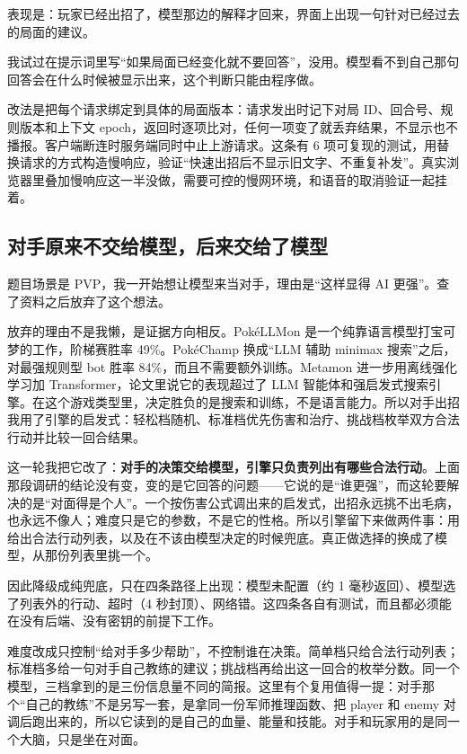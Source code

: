 表现是：玩家已经出招了，模型那边的解释才回来，界面上出现一句针对已经过去的局面的建议。

我试过在提示词里写“如果局面已经变化就不要回答”，没用。模型看不到自己那句回答会在什么时候被显示出来，这个判断只能由程序做。

改法是把每个请求绑定到具体的局面版本：请求发出时记下对局 ID、回合号、规则版本和上下文 epoch，返回时逐项比对，任何一项变了就丢弃结果，不显示也不播报。客户端断连时服务端同时中止上游请求。这条有 6 项可复现的测试，用替换请求的方式构造慢响应，验证“快速出招后不显示旧文字、不重复补发”。真实浏览器里叠加慢响应这一半没做，需要可控的慢网环境，和语音的取消验证一起挂着。

\subsection{对手原来不交给模型，后来交给了模型}

题目场景是 PVP，我一开始想让模型来当对手，理由是“这样显得 AI 更强”。查了资料之后放弃了这个想法。

放弃的理由不是我懒，是证据方向相反。PokéLLMon 是一个纯靠语言模型打宝可梦的工作，阶梯赛胜率 49\%。PokéChamp 换成“LLM 辅助 minimax 搜索”之后，对最强规则型 bot 胜率 84\%，而且不需要额外训练。Metamon 进一步用离线强化学习加 Transformer，论文里说它的表现超过了 LLM 智能体和强启发式搜索引擎。在这个游戏类型里，决定胜负的是搜索和训练，不是语言能力。所以对手出招我用了引擎的启发式：轻松档随机、标准档优先伤害和治疗、挑战档枚举双方合法行动并比较一回合结果。

这一轮我把它改了：\textbf{对手的决策交给模型，引擎只负责列出有哪些合法行动}。上面那段调研的结论没有变，变的是它回答的问题——它说的是“谁更强”，而这轮要解决的是“对面得是个人”。一个按伤害公式调出来的启发式，出招永远挑不出毛病，也永远不像人；难度只是它的参数，不是它的性格。所以引擎留下来做两件事：用  给出合法行动列表，以及在不该由模型决定的时候兜底。真正做选择的换成了模型，从那份列表里挑一个。

 因此降级成纯兜底，只在四条路径上出现：模型未配置（约 1 毫秒返回）、模型选了列表外的行动、超时（4 秒封顶）、网络错。这四条各自有测试，而且都必须能在没有后端、没有密钥的前提下工作。

难度改成只控制“给对手多少帮助”，不控制谁在决策。简单档只给合法行动列表；标准档多给一句对手自己教练的建议；挑战档再给出这一回合的枚举分数。同一个模型，三档拿到的是三份信息量不同的简报。这里有个复用值得一提：对手那个“自己的教练”不是另写一套，是拿同一份军师推理函数、把 player 和 enemy 对调后跑出来的，所以它读到的是自己的血量、能量和技能。对手和玩家用的是同一个大脑，只是坐在对面。

